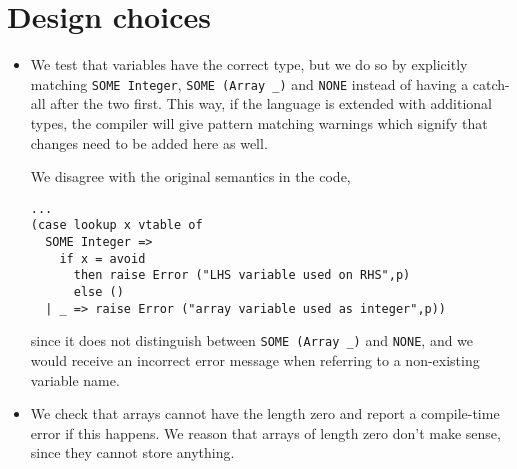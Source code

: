 \section{Design choices}

\begin{itemize}
  \item We test that variables have the correct type, but we do so by
  explicitly matching \verb+SOME Integer+, \verb+SOME (Array _)+ and
  \verb+NONE+ instead of having a catch-all after the two first. This way, if
  the language is extended with additional types, the compiler will give
  pattern matching warnings which signify that changes need to be added here as
  well.

  We disagree with the original semantics in the code,
\begin{verbatim}
...
(case lookup x vtable of
  SOME Integer =>
    if x = avoid
      then raise Error ("LHS variable used on RHS",p)
      else ()
  | _ => raise Error ("array variable used as integer",p))
\end{verbatim}

since it does not distinguish between \verb+SOME (Array _)+ and \verb+NONE+,
and we would receive an incorrect error message when referring to a non-existing
variable name.

  \item We check that arrays cannot have the length zero and report a
  compile-time error if this happens. We reason that arrays of length zero don't
  make sense, since they cannot store anything.
\end{itemize}

